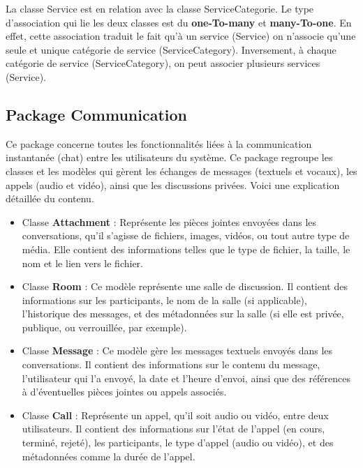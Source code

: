 {\vspace{0.35cm}

La classe Service est en relation avec la classe ServiceCategorie. Le type d'association qui lie les deux classes est du \textbf{one-To-many} et \textbf{many-To-one}. En effet, cette association traduit le fait qu'à un service (Service) on n'associe qu'une seule et unique catégorie de service (ServiceCategory). Inversement, à chaque catégorie de service (ServiceCategory), on peut associer plusieurs services (Service). 

\subsection{Package Communication} \label{subsection_package_communication}
Ce package concerne toutes les fonctionnalités liées à la communication instantanée (chat) entre les utilisateurs du système. Ce package regroupe les classes et les modèles qui gèrent les échanges de messages (textuels et vocaux), les appels (audio et vidéo), ainsi que les discussions privées. Voici une explication détaillée du contenu.

\begin{itemize}
    \item Classe \textbf{Attachment} : Représente les pièces jointes envoyées dans les conversations, qu'il s'agisse de fichiers, images, vidéos, ou tout autre type de média. Elle contient des informations telles que le type de fichier, la taille, le nom et le lien vers le fichier.

    \item Classe \textbf{Room} : Ce modèle représente une salle de discussion. Il contient des informations sur les participants, le nom de la salle (si applicable), l'historique des messages, et des métadonnées sur la salle (si elle est privée, publique, ou verrouillée, par exemple).

    \item Classe \textbf{Message} : Ce modèle gère les messages textuels envoyés dans les conversations. Il contient des informations sur le contenu du message, l'utilisateur qui l'a envoyé, la date et l'heure d'envoi, ainsi que des références à d'éventuelles pièces jointes ou appels associés.

    \item Classe \textbf{Call} : Représente un appel, qu'il soit audio ou vidéo, entre deux utilisateurs. Il contient des informations sur l'état de l'appel (en cours, terminé, rejeté), les participants, le type d'appel (audio ou vidéo), et des métadonnées comme la durée de l'appel.
\end{itemize}

}
